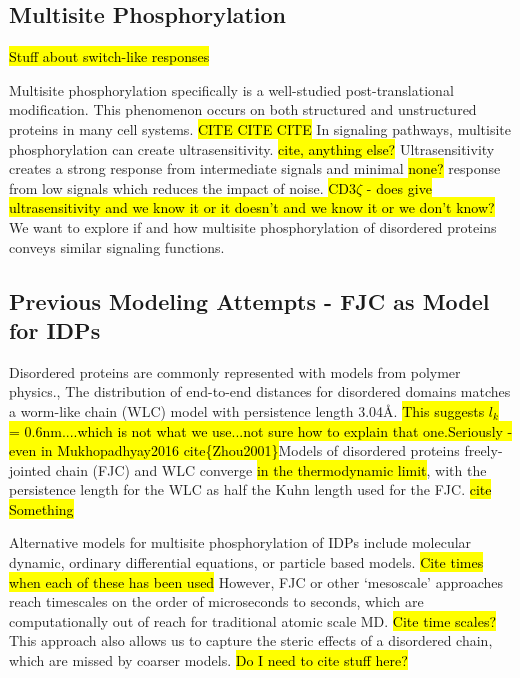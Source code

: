 \documentclass[../AdvancementSummary.tex]{subfiles}
\begin{document}
\subsection{Multisite Phosphorylation}

\hl{Stuff about switch-like responses}

Multisite phosphorylation specifically is a well-studied post-translational modification.  This phenomenon occurs on both structured and unstructured proteins in many cell systems. \hl{CITE CITE CITE} In signaling pathways, multisite phosphorylation can create ultrasensitivity. \hl{cite, anything else?} Ultrasensitivity creates a strong response from intermediate signals and minimal \hl{none?} response from low signals which reduces the impact of noise. \hl{CD3$\zeta$ - does give ultrasensitivity and we know it or it doesn't and we know it or we don't know?} We want to explore if and how multisite phosphorylation of disordered proteins conveys similar signaling functions.



\subsection{Previous Modeling Attempts - FJC as Model for IDPs}

Disordered proteins are commonly represented with models from polymer physics.\cite{VanValen2009},\cite{Reeves2011} The distribution of end-to-end distances for disordered domains matches a worm-like chain (WLC) model with persistence length 3.04\AA . \hl{This suggests $l_k$ = 0.6nm....which is not what we use...not sure how to explain that one.}\hl{Seriously - even in Mukhopadhyay2016 cite\{Zhou2001\}}Models of disordered proteins freely-jointed chain (FJC) and WLC converge \hl{in the thermodynamic limit}, with the persistence length for the WLC as half the Kuhn length used for the FJC. \hl{cite Something} 


Alternative models for multisite phosphorylation of IDPs include molecular dynamic, ordinary differential equations, or particle based models.  \hl{Cite times when each of these has been used} However, FJC or other `mesoscale' approaches reach timescales on the order of microseconds to seconds, which are computationally out of reach for traditional atomic scale MD. \hl{Cite time scales?} This approach also allows us to capture the steric effects of a disordered chain, which are missed by coarser models. \hl{Do I need to cite stuff here?}
\end{document}
